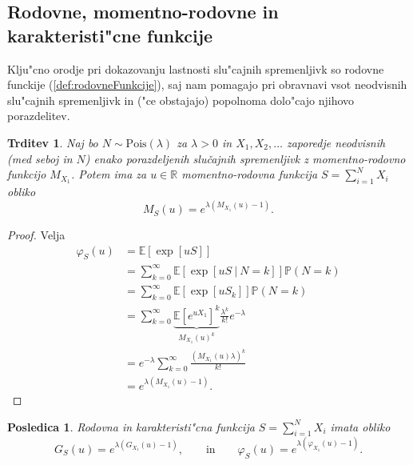 \documentclass[12pt, a4paper, reqno]{amsart}
\theoremstyle{definition}
\theoremstyle{plain}
\newtheorem{trditev}[definicija]{Trditev}
\newtheorem{posledica}[definicija]{Posledica}
\newcommand{\R}{\mathbb{R}}
\newcommand{\E}{\mathbb{E}}
\newcommand{\Prob}{\mathbb{P}}
\newcommand{\1}{\mathds{1}}
\newcommand{\Pois}[1]{\text{Pois}(#1)}
\begin{document}
    \subsection{Rodovne, momentno-rodovne in karakteristi"cne funkcije} Klju"cno \newline orodje pri dokazovanju
    lastnosti slu"cajnih spremenljivk so rodovne funckije (\ref{def:rodovneFunkcije}), saj nam pomagajo
    pri obravnavi vsot neodvisnih slu"cajnih spremenljivk in ("ce obstajajo) popolnoma dolo"cajo njihovo porazdelitev.  

    \begin{trditev}
        Naj bo $N\sim \Pois{\lambda}$  za $\lambda >0$ in $X_1, X_2, \dots$ zaporedje neodvisnih (med seboj in $N$)
        enako porazdeljenih slučajnih spremenljivk z momentno-rodovno funkcijo $M_{X_1}$. Potem ima za $u\in\R$
        momentno-rodovna funkcija $S = \sum_{i=1}^NX_i$ obliko
        \begin{equation*}
            M_{S}(u) = e^{\lambda \left(M_{X_1}(u) - 1\right)}.
        \end{equation*}
        \label{trd:MomentGener}
    \end{trditev}
    
    \begin{proof}
        Velja
        \begin{align}
            \varphi_{S}(u) 
                    &= \E\left[\exp\left[uS\right]\right] \nonumber\\
                    &= \sum_{k=0}^{\infty}
                        \E\left[\exp\left[uS \ \big| \ N=k\right]\right]\Prob\left(N = k\right) \nonumber \\ 
                    &= \sum_{k=0}^{\infty}
                        \E\left[\exp\left[uS_k\right]\right]\Prob\left(N = k\right) \nonumber \\
                    &= \sum_{k=0}^{\infty}
                        \underbrace{\E\left[e^{uX_1}\right]^k}_{M_{X_1}(u)^k}\frac{\lambda^k}{k!}e^{-\lambda } \label{eq:MomentS}\\ 
                    &= e^{-\lambda }\sum_{k=0}^\infty\frac{\left(M_{X_1}(u)\lambda \right)^k}{k!} \nonumber \\
                    &= e^{\lambda \left(M_{X_1}(u) - 1\right)}. \nonumber
        \end{align}
    \end{proof}
    
    \begin{posledica}
        Rodovna in karakteristi"cna funkcija $S=\sum_{i = 1}^{N}X_i$ imata obliko 
        \begin{equation*}
            G_{S}(u) = e^{\lambda \left(G_{X_1}(u) - 1\right)}, \qquad \text{in} \qquad
            \varphi_{S}(u) = e^{\lambda \left(\varphi_{X_1}(u) - 1\right)}.
        \end{equation*}
        \label{pos:RodovnaKarakteristicna}
    \end{posledica}
\end{document}
